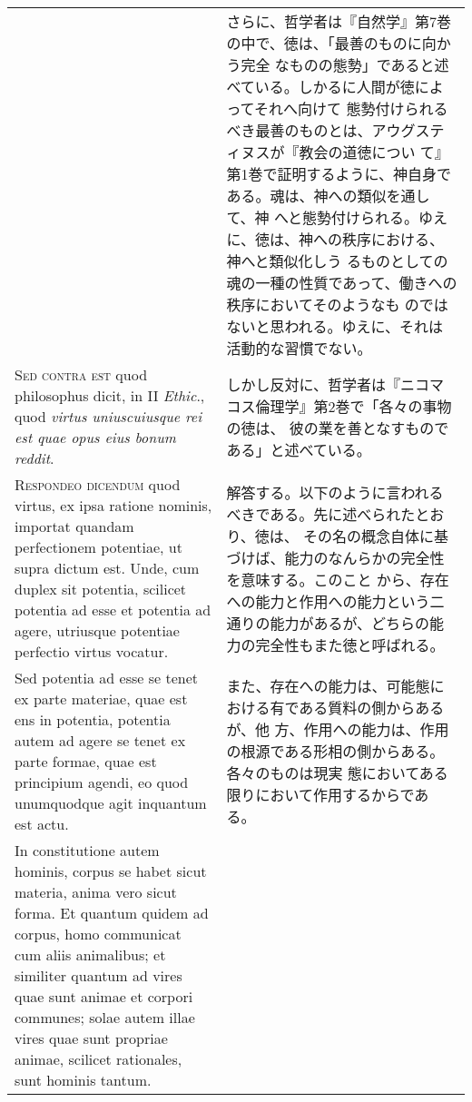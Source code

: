 \documentclass[10pt]{jsarticle}
\begin{document}
\begin{longtable}{p{21em}p{21em}}
&

さらに、哲学者は『自然学』第7巻の中で、徳は、「最善のものに向かう完全
なものの態勢」であると述べている。しかるに人間が徳によってそれへ向けて
態勢付けられるべき最善のものとは、アウグスティヌスが『教会の道徳につい
て』第1巻で証明するように、神自身である。魂は、神への類似を通して、神
へと態勢付けられる。ゆえに、徳は、神への秩序における、神へと類似化しう
るものとしての魂の一種の性質であって、働きへの秩序においてそのようなも
のではないと思われる。ゆえに、それは活動的な習慣でない。

\\

{\scshape Sed contra est} quod philosophus dicit, in II {\itshape
Ethic}., quod {\itshape virtus uniuscuiusque rei est quae opus eius
bonum reddit}.

&

しかし反対に、哲学者は『ニコマコス倫理学』第2巻で「各々の事物の徳は、
彼の業を善となすものである」と述べている。

\\

{\scshape Respondeo dicendum} quod virtus, ex ipsa ratione nominis,
importat quandam perfectionem potentiae, ut supra dictum est. Unde,
cum duplex sit potentia, scilicet potentia ad esse et potentia ad
agere, utriusque potentiae perfectio virtus vocatur.

&

解答する。以下のように言われるべきである。先に述べられたとおり、徳は、
その名の概念自体に基づけば、能力のなんらかの完全性を意味する。このこと
から、存在への能力と作用への能力という二通りの能力があるが、どちらの能
力の完全性もまた徳と呼ばれる。

\\

Sed potentia ad esse se tenet ex parte materiae, quae est ens in
potentia, potentia autem ad agere se tenet ex parte formae, quae est
principium agendi, eo quod unumquodque agit inquantum est actu.

&

また、存在への能力は、可能態における有である質料の側からあるが、他
方、作用への能力は、作用の根源である形相の側からある。各々のものは現実
態においてある限りにおいて作用するからである。

\\

In constitutione autem hominis, corpus se habet sicut materia, anima
vero sicut forma. Et quantum quidem ad corpus, homo communicat cum
aliis animalibus; et similiter quantum ad vires quae sunt animae et
corpori communes; solae autem illae vires quae sunt propriae animae,
scilicet rationales, sunt hominis tantum.


\end{longtable}
\end{document}

